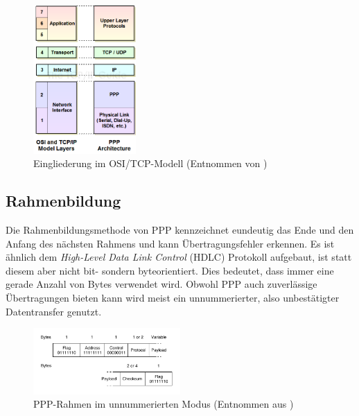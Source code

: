 \documentclass[journal,11pt]{IEEEtran}
\begin{document}
\begin{figure}[h!]
 \centering
  \includegraphics[width=0.35\textwidth]{img/ppplayers}
 \caption{Eingliederung im OSI/TCP-Modell (Entnommen von \cite{ppposi})}
 \label{fig:osi}
\end{figure}

\subsection{Rahmenbildung}
Die Rahmenbildungsmethode von PPP kennzeichnet eundeutig das Ende und den Anfang des nächsten Rahmens und kann Übertragungsfehler erkennen. Es ist ähnlich dem \textit{High-Level Data Link Control} (HDLC) Protokoll aufgebaut, ist statt diesem aber nicht bit- sondern byteorientiert. Dies bedeutet, dass immer eine gerade Anzahl von Bytes verwendet wird. Obwohl PPP auch zuverlässige Übertragungen bieten kann wird meist ein unnummerierter, also unbestätigter Datentransfer genutzt.

\begin{figure}[h!]
 \centering
  \includegraphics[width=0.5\textwidth]{img/ppprahmen}
 \caption{PPP-Rahmen im unnummerierten Modus (Entnommen aus \cite{compnetzw})}
 \label{fig:ppprahmen}
\end{figure}
\end{document}

